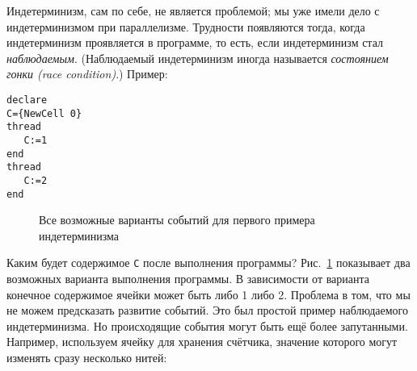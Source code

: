 Индетерминизм, сам по себе, не является проблемой; мы уже имели дело с индетерминизмом при параллелизме. Трудности появляются тогда, когда индетерминизм проявляется в программе, то есть, если индетерминизм стал \emph{наблюдаемым}. (Наблюдаемый индетерминизм иногда называется \emph{состоянием гонки (race condition)}.) Пример:

\begin{lstlisting}
declare
C={NewCell 0}
thread
   C:=1
end
thread
   C:=2
end
\end{lstlisting}


\newcommand\execsample[6]{
  \draw [->] (#1, #2) -- (#1 + 8, #2);
  \draw (#1 + 1, #2 - 1) -- (#1 + 1, #2 + 1);
  \node [above] at (#1 + 1, #2 + 1) {#3};

  \draw (#1 + 4, #2 - 1) -- (#1 + 4, #2 + 1);
  \node [above] at (#1 + 4, #2 + 1) {#4};

  \draw (#1 + 6, #2 - 1) -- (#1 + 6, #2 + 1);
  \node [above] at (#1 + 6, #2 + 1) {#5};

  \node [text width=3cm, right] at (#1 + 8, #2) {#6};
}


\begin{figure}
\caption{Все возможные варианты событий для первого примера индетерминизма}
\label{figure:Executions_first_nondeterm_example}
\end{figure}

Каким будет содержимое \lstinline|C| после выполнения программы? Рис.~\ref{figure:Executions_first_nondeterm_example} показывает два возможных варианта выполнения программы. В зависимости от варианта конечное содержимое ячейки может быть либо 1 либо 2. Проблема в том, что мы не можем предсказать развитие событий. Это был простой пример наблюдаемого индетерминизма. Но происходящие события могут быть ещё более запутанными. Например, используем ячейку для хранения счётчика, значение которого могут изменять сразу несколько нитей:

